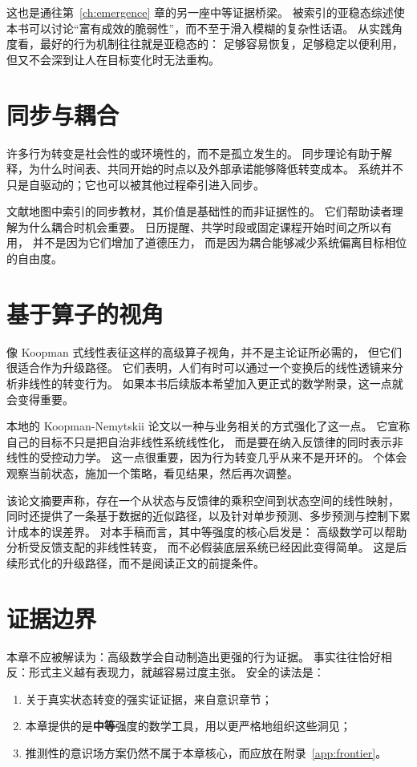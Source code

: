 这也是通往第~\ref{ch:emergence} 章的另一座中等证据桥梁。
被索引的亚稳态综述使本书可以讨论“富有成效的脆弱性”，而不至于滑入模糊的复杂性话语。
从实践角度看，最好的行为机制往往就是亚稳态的：
足够容易恢复，足够稳定以便利用，但又不会深到让人在目标变化时无法重构。

\section{同步与耦合}

许多行为转变是社会性的或环境性的，而不是孤立发生的。
同步理论有助于解释，为什么时间表、共同开始的时点以及外部承诺能够降低转变成本。
系统并不只是自驱动的；它也可以被其他过程牵引进入同步。

文献地图中索引的同步教材，其价值是基础性的而非证据性的。
它们帮助读者理解为什么耦合时机会重要。
日历提醒、共学时段或固定课程开始时间之所以有用，
并不是因为它们增加了道德压力，
而是因为耦合能够减少系统偏离目标相位的自由度。

\section{基于算子的视角}

像 Koopman 式线性表征这样的高级算子视角，并不是主论证所必需的，
但它们很适合作为升级路径。
它们表明，人们有时可以通过一个变换后的线性透镜来分析非线性的转变行为。
如果本书后续版本希望加入更正式的数学附录，这一点就会变得重要。

本地的 Koopman-Nemytskii 论文以一种与业务相关的方式强化了这一点。
它宣称自己的目标不只是把自治非线性系统线性化，
而是要在纳入反馈律的同时表示非线性的受控动力学。
这一点很重要，因为行为转变几乎从来不是开环的。
个体会观察当前状态，施加一个策略，看见结果，然后再次调整。

该论文摘要声称，存在一个从状态与反馈律的乘积空间到状态空间的线性映射，
同时还提供了一条基于数据的近似路径，以及针对单步预测、多步预测与控制下累计成本的误差界。
对本手稿而言，其中等强度的核心启发是：
高级数学可以帮助分析受反馈支配的非线性转变，
而不必假装底层系统已经因此变得简单。
这是后续形式化的升级路径，而不是阅读正文的前提条件。

\section{证据边界}

本章不应被解读为：高级数学会自动制造出更强的行为证据。
事实往往恰好相反：形式主义越有表现力，就越容易过度主张。
安全的读法是：
\begin{enumerate}[nosep]
  \item 关于真实状态转变的强实证证据，来自意识章节；
  \item 本章提供的是\textbf{中等}强度的数学工具，用以更严格地组织这些洞见；
  \item 推测性的意识场方案仍然不属于本章核心，而应放在附录~\ref{app:frontier}。
\end{enumerate}

